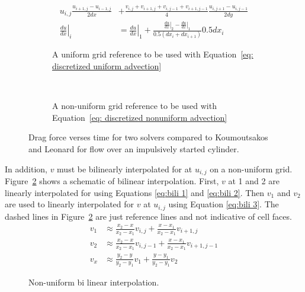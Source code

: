 \begin{align}
u_{i,j}\frac{u_{i+1,j} - u_{i-1,j}}{2dx} &+ \frac{v_{i,j} + v_{i+1,j} + v_{i,j-1} + v_{i+1,j-1}}{4}\frac{u_{i,j+1} - u_{i,j-1}}{2dy} \label{eq: discretized uniform advection}\\
\left.\frac{du}{dx}\right|_i&=\left.\frac{du}{dx}\right|_1 + \frac{\left.\frac{du}{dx}\right|_2 - \left.\frac{du}{dx}\right|_1}{0.5(dx_i + dx_{i+1})}0.5dx_i\; \label{eq: discretized nonuniform advection} 
\end{align}
\begin{figure}[!htb]
	\centering
	\begin{subfigure}{0.4\textwidth}
		
		\caption{A uniform grid reference to be used with Equation~\eqref{eq: discretized uniform advection}}
	\end{subfigure}
	~
	\begin{subfigure}{0.4\textwidth}
		
		\caption{A non-uniform grid reference to be used with Equation~\eqref{eq: discretized nonuniform advection}}
	\end{subfigure}
	\caption{Drag force verses time for two solvers compared to Koumoutsakos and Leonard for flow over an impulsively started cylinder.}
	\label{fig:discretized uniform advection}
\end{figure}

In addition, $v$ must be bilinearly interpolated for at $u_{i,j}$ on a non-uniform grid.
Figure~\ref{fig:bi-linear-interpolation} shows a schematic of bilinear interpolation.
First, $v$ at 1 and 2 are linearly interpolated for using Equations \eqref{eq:bili 1} and \eqref{eq:bili 2}. 
Then $v_1$ and $v_2$ are used to linearly interpolated for $v$ at $u_{i,j}$ using Equation \eqref{eq:bili 3}. 
The dashed lines in Figure~\ref{fig:bi-linear-interpolation} are just reference lines and not indicative of cell faces. 
\begin{align}
v_1 &\approx \frac{x_2 - x}{x_2 - x_1}v_{i,j} + \frac{x - x_1}{x_2 - x_1}v_{i+1,j} \label{eq:bili 1} \\
v_2 &\approx \frac{x_2 - x}{x_2 - x_1}v_{i,j-1} + \frac{x - x_1}{x_2 - x_1}v_{i+1,j-1} \label{eq:bili 2} \\
v_x &\approx \frac{y_2 - y}{y_2 - y_1}v_{1} + \frac{y - y_1}{y_2 - y_1}v_{2} \; \label{eq:bili 3}
\end{align}
\begin{figure}[htb]
	\centering
	
	\caption{Non-uniform bi linear interpolation.}
	\label{fig:bi-linear-interpolation}
\end{figure}

